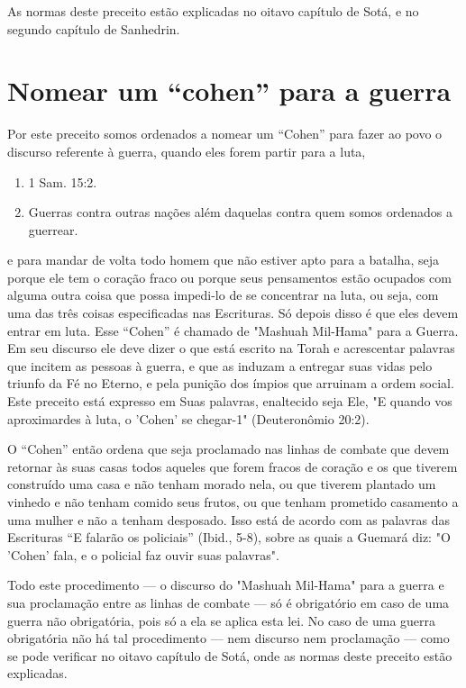 As normas deste preceito estão explicadas no oitavo capítulo de So­tá, e
no segundo capítulo de Sanhedrin.

\section{Nomear um ``cohen'' para a guerra}

Por este preceito somos ordenados a nomear um ``Cohen'' para fa­zer ao
povo o discurso referente à guerra, quando eles forem partir para a
luta,


\begin{enumerate}
\def\labelenumi{\arabic{enumi}.}
\setcounter{enumi}{194}
\item
 
 1 Sam. 15:2.
 
\item
 
 Guerras contra outras nações além daquelas contra quem somos ordenados
 a guerrear.
 
\end{enumerate}

e para mandar de volta todo homem que não estiver apto para a batalha,
seja porque ele tem o coração fraco ou porque seus pensamentos estão
ocupados com alguma outra coisa que possa impedi-lo de se concentrar na
luta, ou seja, com uma das três coisas especificadas nas Escrituras. Só
depois disso é que eles devem entrar em luta. Esse ``Cohen'' é chamado de
"Mashuah Mil-Hama" para a Guerra. Em seu discurso ele deve dizer o que
está escrito na Torah e acres­centar palavras que incitem as pessoas à
guerra, e que as induzam a entregar suas vidas pelo triunfo da Fé no
Eterno, e pela punição dos ímpios que arrui­nam a ordem social. Este
preceito está expresso em Suas palavras, enaltecido seja Ele, "E quando
vos aproximardes à luta, o 'Cohen' se chegar-1" (Deutero­nômio 20:2).

O ``Cohen'' então ordena que seja proclamado nas linhas de comba­te que
devem retornar às suas casas todos aqueles que forem fracos de coração e
os que tiverem construído uma casa e não tenham morado nela, ou que
tive­rem plantado um vinhedo e não tenham comido seus frutos, ou que
tenham prometido casamento a uma mulher e não a tenham desposado. Isso
está de acordo com as palavras das Escrituras ``E falarão os policiais''
(Ibid., 5-8), sobre as quais a Guemará diz: "O 'Cohen' fala, e o
policial faz ouvir suas palavras".

Todo este procedimento --- o discurso do "Mashuah Mil-Hama" pa­ra a
guerra e sua proclamação entre as linhas de combate --- só é obrigatório
em caso de uma guerra não obrigatória, pois só a ela se aplica esta lei.
No caso de uma guerra obrigatória não há tal procedimento --- nem
discurso nem pro­clamação --- como se pode verificar no oitavo capítulo
de Sotá, onde as nor­mas deste preceito estão explicadas.

